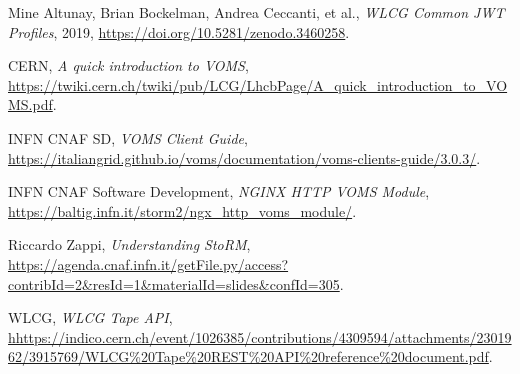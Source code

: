 \begin{thebibliography}{99}
	Mine Altunay, Brian Bockelman, Andrea Ceccanti, et al., \textit{WLCG Common JWT Profiles}, 2019,
	\url{https://doi.org/10.5281/zenodo.3460258}.
	
	CERN, \textit{A quick introduction to VOMS},
	\url{https://twiki.cern.ch/twiki/pub/LCG/LhcbPage/A_quick_introduction_to_VOMS.pdf}.

	INFN CNAF SD,
	\textit{VOMS Client Guide},
	\url{https://italiangrid.github.io/voms/documentation/voms-clients-guide/3.0.3/}.
	
	INFN CNAF Software Development,
	\textit{NGINX HTTP VOMS Module},
	\url{https://baltig.infn.it/storm2/ngx_http_voms_module/}.

	Riccardo Zappi, \textit{Understanding StoRM},
	\url{https://agenda.cnaf.infn.it/getFile.py/access?contribId=2&resId=1&materialId=slides&confId=305}.

	WLCG,
	\textit{WLCG Tape API},
	\url{hhttps://indico.cern.ch/event/1026385/contributions/4309594/attachments/2301962/3915769/WLCG%20Tape%20REST%20API%20reference%20document.pdf}.
	

\end{thebibliography}